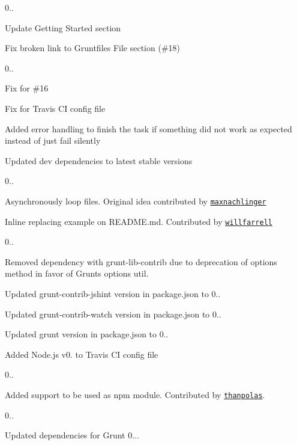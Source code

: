 0..
\begin{DoxyItemize}
\item Update Getting Started section
\item Fix broken link to Gruntfile\textquotesingle{}s File section (\#18)
\end{DoxyItemize}

0..
\begin{DoxyItemize}
\item Fix for \#16
\item Fix for Travis CI config file
\item Added error handling to finish the task if something did not work as expected instead of just fail silently
\item Updated dev dependencies to latest stable versions
\end{DoxyItemize}

0..
\begin{DoxyItemize}
\item Asynchronously loop files. Original idea contributed by \href{https://github.com/maxnachlinger}{\tt maxnachlinger}
\item Inline replacing example on R\+E\+A\+D\+M\+E.\+md. Contributed by \href{https://github.com/willfarrell}{\tt willfarrell}
\end{DoxyItemize}

0..
\begin{DoxyItemize}
\item Removed dependency with grunt-\/lib-\/contrib due to deprecation of \textquotesingle{}options\textquotesingle{} method in favor of Grunt\textquotesingle{}s \textquotesingle{}options\textquotesingle{} util.
\item Updated grunt-\/contrib-\/jshint version in package.\+json to 0..
\item Updated grunt-\/contrib-\/watch version in package.\+json to 0..
\item Updated grunt version in package.\+json to 0..
\item Added Node.\+js v0. to Travis CI config file
\end{DoxyItemize}

0..
\begin{DoxyItemize}
\item Added support to be used as npm module. Contributed by \href{https://github.com/thanpolas}{\tt thanpolas}.
\end{DoxyItemize}

0..
\begin{DoxyItemize}
\item Updated dependencies for Grunt 0...
\end{DoxyItemize}

